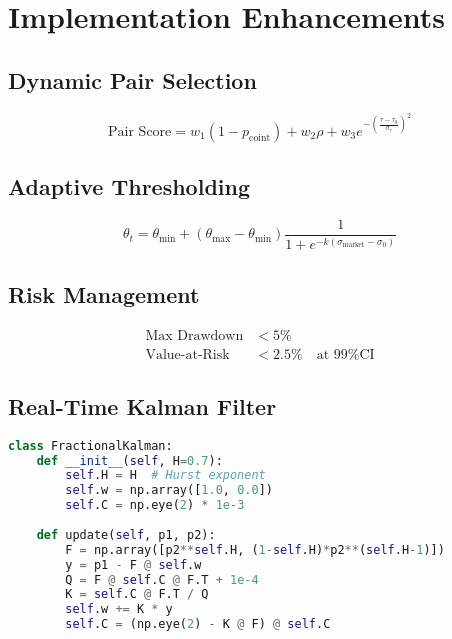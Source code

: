 \documentclass[article]{arithmaxresearch}
\begin{document}
\section{Implementation Enhancements}

\subsection{Dynamic Pair Selection}
\begin{equation}
\text{Pair Score} = w_1(1 - p_{\text{coint}}) + w_2\rho + w_3e^{-\left(\frac{\tau - \tau_0}{\sigma_{\tau}}\right)^2}
\end{equation}

\subsection{Adaptive Thresholding}
\begin{equation}
\theta_t = \theta_{\min} + (\theta_{\max} - \theta_{\min}) \frac{1}{1 + e^{-k(\sigma_{\text{market}} - \sigma_0)}}
\end{equation}

\subsection{Risk Management}
\begin{align}
\text{Max Drawdown} &< 5\% \\
\text{Value-at-Risk} &< 2.5\% \quad \text{at 99\% CI}
\end{align}

\subsection{Real-Time Kalman Filter}
\begin{lstlisting}[language=Python, basicstyle=\small\ttfamily]
class FractionalKalman:
    def __init__(self, H=0.7):
        self.H = H  # Hurst exponent
        self.w = np.array([1.0, 0.0])
        self.C = np.eye(2) * 1e-3
        
    def update(self, p1, p2):
        F = np.array([p2**self.H, (1-self.H)*p2**(self.H-1)])
        y = p1 - F @ self.w
        Q = F @ self.C @ F.T + 1e-4
        K = self.C @ F.T / Q
        self.w += K * y
        self.C = (np.eye(2) - K @ F) @ self.C
\end{lstlisting}
\end{document}
